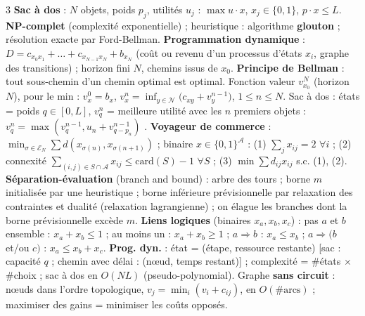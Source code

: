 \begin{multicols}{3}
\B \textbf{Sac à dos} : $N$ objets, poids $p_j$, utilités $u_j$ : $\max u\cdot x$, $x_j\in\{0,1\}$, $p\cdot x\le L$. \textbf{NP-complet} (complexité exponentielle) ; heuristique : algorithme \textbf{glouton} ; résolution exacte par Ford-Bellman.
\B \textbf{Programmation dynamique} : $D=c_{x_0x_1}+\dots+c_{x_{N-1}x_N}+b_{x_N}$ (coût ou revenu d'un processus d'états $x_i$, graphe des transitions) ; horizon fini $N$, chemins issus de $x_0$. \textbf{Principe de Bellman} : tout sous-chemin d'un chemin optimal est optimal.
\B {} Fonction valeur $v^N_{x_0}$ (horizon $N$), pour le min : $v^0_x=b_x$, $v^n_x=\inf_{y\in\mathcal N}\big(c_{xy}+v^{n-1}_y\big)$, $1\le n\le N$.
\B Sac à dos : états = poids $q\in[0,L]$, $v^n_q$ = meilleure utilité avec les $n$ premiers objets : $v^n_q=\max(v^{n-1}_q,u_n+v^{n-1}_{q-p_n})$ .
\B \textbf{Voyageur de commerce} : $\min_{\sigma\in\mathcal E_N}\sum d(x_{\sigma(n)},x_{\sigma(n+1)})$ ; binaire $x\in\{0,1\}^{\mathcal A}$ : (1) $\sum_jx_{ij}=2$ $\forall i$ ; (2) connexité $\sum_{(i,j)\in S\cap\mathcal A}x_{ij}\le\mathrm{card}(S)-1$ $\forall S$ ; (3) $\min\sum d_{ij}x_{ij}$ s.c. (1), (2).
\B \textbf{Séparation-évaluation} (branch and bound) : arbre des tours ; borne $m$ initialisée par une heuristique ; borne inférieure prévisionnelle par relaxation des contraintes et dualité (relaxation lagrangienne) ; on élague les branches dont la borne prévisionnelle excède $m$.
\B \textbf{Liens logiques} (binaires $x_a,x_b,x_c$) : pas $a$ et $b$ ensemble : $x_a+x_b\le1$ ; au moins un : $x_a+x_b\ge1$ ; $a\Rightarrow b$ : $x_a\le x_b$ ; $a\Rightarrow(b$ et/ou $c)$ : $x_a\le x_b+x_c$.
\Ast \Mt\textbf{Prog. dyn.} : état = (étape, ressource restante) [sac : capacité $q$ ; chemin avec délai : (nœud, temps restant)] ; complexité = $\#$états $\times$ $\#$choix ; sac à dos en $O(NL)$ (pseudo-polynomial).
\Ast Graphe \textbf{sans circuit} : nœuds dans l'ordre topologique, $v_j=\min_i(v_i+c_{ij})$, en $O(\#\text{arcs})$ ; maximiser des gains = minimiser les coûts opposés.

\end{multicols}
